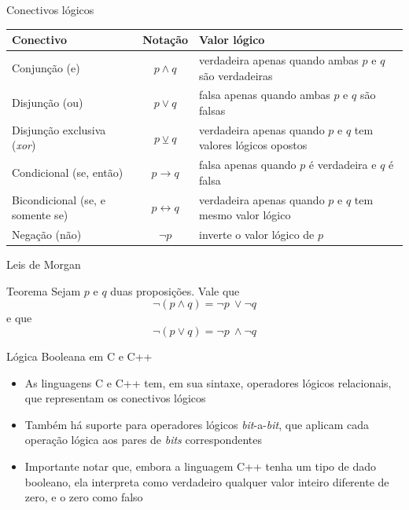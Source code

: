 \begin{frame}[fragile]{Conectivos lógicos}

    \begin{table}[h]
    \centering

    \begin{tabularx}{0.9\textwidth}{lcX}
        \toprule
        \textbf{Conectivo} & \textbf{Notação} & \textbf{Valor lógico} \\
        \midrule
        Conjunção (e) & $p \land q$ & verdadeira apenas quando ambas $p$ e $q$ são verdadeiras\\
        \rowcolor[gray]{0.9}
        Disjunção (ou) & $p \lor q$ & falsa apenas quando ambas $p$ e $q$ são falsas\\
        Disjunção exclusiva (\textit{xor}) & $p \veebar q$ & verdadeira apenas quando $p$ e $q$ tem valores lógicos opostos \\
        \rowcolor[gray]{0.9}
        Condicional (se, então) & $p \to q$ & falsa apenas quando $p$ é verdadeira e $q$ é falsa\\
        Bicondicional (se, e somente se) & $p \leftrightarrow q$ & verdadeira apenas quando $p$ e $q$ tem mesmo valor lógico\\
        \rowcolor[gray]{0.9}
        Negação (não) & $\lnot p$ & inverte o valor lógico de $p$\\
        \bottomrule
    \end{tabularx}
    \end{table}

\end{frame}

\begin{frame}[fragile]{Leis de Morgan}

    \begin{block}{Teorema}
        Sejam $p$ e $q$ duas proposições. Vale que
        $$
            \lnot (p \land q) = \lnot p\ \lor \lnot q
        $$
        e que
        $$
            \lnot (p \lor q) = \lnot p\ \land \lnot q
        $$
    \end{block}

\end{frame}

\begin{frame}[fragile]{Lógica Booleana em C e C++}

    \begin{itemize}
        \item As linguagens C e C++ tem, em sua sintaxe, operadores lógicos relacionais, que representam os conectivos lógicos

        \item Também há suporte para operadores lógicos \textit{bit}-a-\textit{bit}, que aplicam cada operação lógica aos pares de \textit{bits} correspondentes 

        \item Importante notar que, embora a linguagem C++ tenha um tipo de dado booleano, ela interpreta como verdadeiro qualquer valor inteiro diferente de zero, e o zero como falso
    \end{itemize}

\end{frame}

